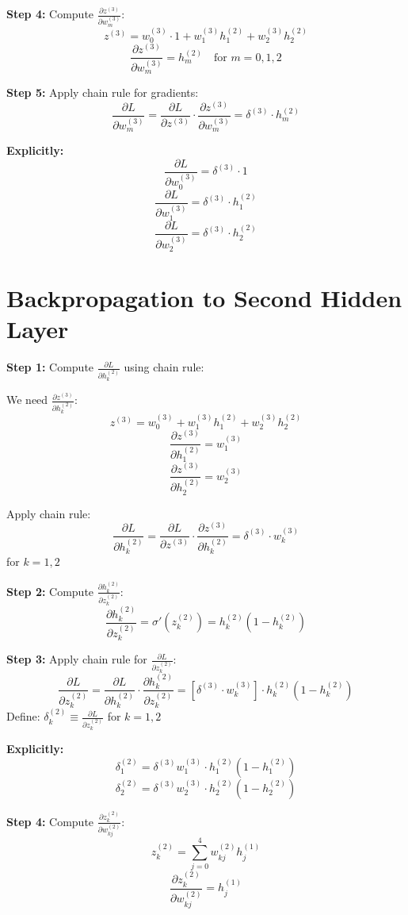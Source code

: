 \documentclass{article}
\begin{document}
\textbf{Step 4:} Compute \( \frac{\partial z^{(3)}}{\partial w_m^{(3)}} \):
\[
z^{(3)} = w_0^{(3)} \cdot 1 + w_1^{(3)} h_1^{(2)} + w_2^{(3)} h_2^{(2)}
\]
\[
\frac{\partial z^{(3)}}{\partial w_m^{(3)}} = h_m^{(2)} \quad \text{for } m = 0,1,2
\]

\textbf{Step 5:} Apply chain rule for gradients:
\[
\frac{\partial L}{\partial w_m^{(3)}} = \frac{\partial L}{\partial z^{(3)}} \cdot \frac{\partial z^{(3)}}{\partial w_m^{(3)}} = \delta^{(3)} \cdot h_m^{(2)}
\]

\textbf{Explicitly:}
\[
\frac{\partial L}{\partial w_0^{(3)}} = \delta^{(3)} \cdot 1
\]
\[
\frac{\partial L}{\partial w_1^{(3)}} = \delta^{(3)} \cdot h_1^{(2)}
\]
\[
\frac{\partial L}{\partial w_2^{(3)}} = \delta^{(3)} \cdot h_2^{(2)}
\]

\section{Backpropagation to Second Hidden Layer}

\textbf{Step 1:} Compute \( \frac{\partial L}{\partial h_k^{(2)}} \) using chain rule:

We need \( \frac{\partial z^{(3)}}{\partial h_k^{(2)}} \):
\[
z^{(3)} = w_0^{(3)} + w_1^{(3)} h_1^{(2)} + w_2^{(3)} h_2^{(2)}
\]
\[
\frac{\partial z^{(3)}}{\partial h_1^{(2)}} = w_1^{(3)}
\]
\[
\frac{\partial z^{(3)}}{\partial h_2^{(2)}} = w_2^{(3)}
\]

Apply chain rule:
\[
\frac{\partial L}{\partial h_k^{(2)}} = \frac{\partial L}{\partial z^{(3)}} \cdot \frac{\partial z^{(3)}}{\partial h_k^{(2)}} = \delta^{(3)} \cdot w_k^{(3)}
\]
for \( k = 1,2 \)

\textbf{Step 2:} Compute \( \frac{\partial h_k^{(2)}}{\partial z_k^{(2)}} \):
\[
\frac{\partial h_k^{(2)}}{\partial z_k^{(2)}} = \sigma'(z_k^{(2)}) = h_k^{(2)}(1 - h_k^{(2)})
\]

\textbf{Step 3:} Apply chain rule for \( \frac{\partial L}{\partial z_k^{(2)}} \):
\[
\frac{\partial L}{\partial z_k^{(2)}} = \frac{\partial L}{\partial h_k^{(2)}} \cdot \frac{\partial h_k^{(2)}}{\partial z_k^{(2)}} = \left[ \delta^{(3)} \cdot w_k^{(3)} \right] \cdot h_k^{(2)}(1 - h_k^{(2)})
\]
Define: \( \delta_k^{(2)} \equiv \frac{\partial L}{\partial z_k^{(2)}} \) for \( k = 1,2 \)

\textbf{Explicitly:}
\[
\delta_1^{(2)} = \delta^{(3)} w_1^{(3)} \cdot h_1^{(2)}(1 - h_1^{(2)})
\]
\[
\delta_2^{(2)} = \delta^{(3)} w_2^{(3)} \cdot h_2^{(2)}(1 - h_2^{(2)})
\]

\textbf{Step 4:} Compute \( \frac{\partial z_k^{(2)}}{\partial w_{kj}^{(2)}} \):
\[
z_k^{(2)} = \sum_{j=0}^{4} w_{kj}^{(2)} h_j^{(1)}
\]
\[
\frac{\partial z_k^{(2)}}{\partial w_{kj}^{(2)}} = h_j^{(1)}
\]
\end{document}
